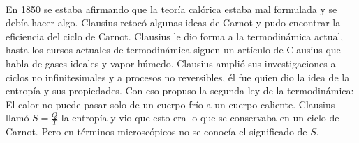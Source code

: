 \\
En 1850 se estaba afirmando que la teoría calórica estaba mal formulada y se debía hacer algo. Clausius retocó algunas ideas de Carnot y pudo encontrar la eficiencia del ciclo de Carnot. Clausius le dio forma a la termodinámica actual, hasta los cursos actuales de termodinámica siguen un artículo de Clausius que habla de gases ideales y vapor húmedo. Clausius amplió sus investigaciones a ciclos no infinitesimales y a procesos no reversibles, él fue quien dio la idea de la entropía y sus propiedades. Con eso propuso la segunda ley de la termodinámica: El calor no puede pasar solo de un cuerpo frío a un cuerpo caliente. Clausius llamó $S=\frac{Q}{T}$ la entropía y vio que esto era lo que se conservaba en un ciclo de Carnot. Pero en términos microscópicos no se conocía el significado de $S$.
\\
